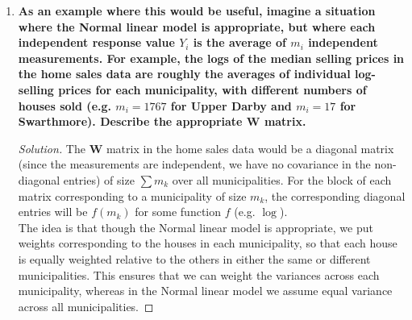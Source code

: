 \documentclass[11pt]{article}
\newenvironment{solution}
  {\renewcommand\qedsymbol{$\blacksquare$}\begin{proof}[Solution]}
  {\end{proof}}
\begin{document}
\begin{enumerate}
\begin{enumerate}
\begin{solution}
		Similarly,
		\begin{align*}
			\mathrm{Var} \left[\hat{\bm{\beta}} \right] &= \mathrm{Var} \left[ (\bm{X}^T \bm{WX})^{-1} \bm{X}^T \bm{W} \bm{Y} \right] \\
			&= (\bm{X}^T \bm{WX})^{-1} \bm{X}^T \bm{W} \,\mathrm{Var} \left[Y \right] ((\bm{X}^T \bm{WX})^{-1} \bm{X}^T \bm{W})^T \\
			&= (\bm{X}^T \bm{WX})^{-1} \bm{X}^T \bm{W} \sigma^2 \bm{W}^{-1} ((\bm{X}^T \bm{WX})^{-1} \bm{X}^T \bm{W})^T \\
			&= \sigma^2 (\bm{X}^T \bm{WX})^{-1} \bm{X}^T \bm{W} \bm{W}^{-1}\bm{W}^T\bm{X} ((\bm{X}^T \bm{WX})^{-1})^T \\\
			&= \sigma^2 (\bm{X}^T \bm{WX})^{-1} \bm{X}^T \bm{W}\bm{X} ((\bm{X}^T \bm{WX})^{-1})^T \\
			&= \sigma^2 (\bm{X}^T \bm{WX})^{-1}.
		\end{align*}
		Thus, we find that the sampling distribution for $\bm{\hat{\beta}}$ is
		\[
			\boxed{\bm{\hat{\beta}} \mid \bm{\beta}, \sigma^2 \sim N_p(\bm{\beta}, \sigma^2(\bm{X}^T\bm{WX})^{-1})}. \, \qedhere
		\]
	  \end{solution}
		
      \item \textbf{As an example where this would be useful, imagine a situation where the Normal linear model is appropriate, 
      but where each independent response value $Y_i$ is the average of $m_i$ independent measurements. For example, the logs of the median
      selling prices in the home sales data are roughly the averages of individual log-selling prices for each municipality, with different numbers
      of houses sold (e.g. $m_i = 1767$ for Upper Darby and $m_i = 17$ for Swarthmore). Describe the appropriate $\bm{W}$ matrix.}

	  \begin{solution}
		The $\bm{W}$ matrix in the home sales data would be a diagonal matrix (since the measurements are independent, we have no covariance in the non-diagonal entries) 
		of size $\sum m_k$ over all municipalities. For the block of each matrix corresponding to a municipality of size $m_k$, the corresponding diagonal entries will be $f(m_k)$ for some function $f$
		(e.g. $\log$). \\

		The idea is that though the Normal linear model is appropriate, we put
		weights corresponding to the houses in each municipality, so that each house is equally weighted relative to the others in either the same or different municipalities.
		This ensures that we can weight the variances across each municipality, whereas in the Normal linear model we assume equal variance across all municipalities.
	  \end{solution}
    \end{enumerate}
\end{enumerate}
\end{document}
